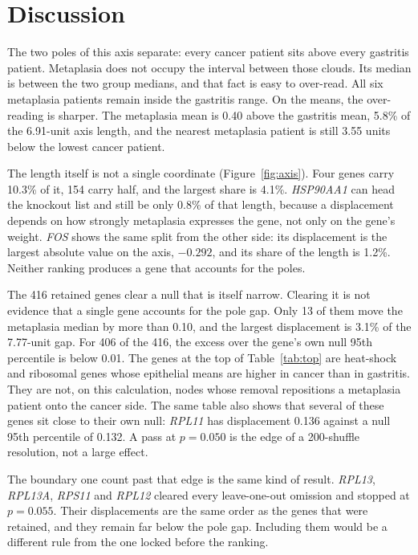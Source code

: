 \documentclass[11pt,a4paper]{article}
\begin{document}
\section{Discussion}

The two poles of this axis separate: every cancer patient sits above every gastritis patient. Metaplasia does not occupy the interval between those clouds. Its median is between the two group medians, and that fact is easy to over-read. All six metaplasia patients remain inside the gastritis range. On the means, the over-reading is sharper. The metaplasia mean is 0.40 above the gastritis mean, 5.8\% of the 6.91-unit axis length, and the nearest metaplasia patient is still 3.55 units below the lowest cancer patient.

The length itself is not a single coordinate (Figure~\ref{fig:axis}). Four genes carry 10.3\% of it, 154 carry half, and the largest share is 4.1\%. \textit{HSP90AA1} can head the knockout list and still be only 0.8\% of that length, because a displacement depends on how strongly metaplasia expresses the gene, not only on the gene's weight. \textit{FOS} shows the same split from the other side: its displacement is the largest absolute value on the axis, $-0.292$, and its share of the length is 1.2\%. Neither ranking produces a gene that accounts for the poles.

The 416 retained genes clear a null that is itself narrow. Clearing it is not evidence that a single gene accounts for the pole gap. Only 13 of them move the metaplasia median by more than 0.10, and the largest displacement is 3.1\% of the 7.77-unit gap. For 406 of the 416, the excess over the gene's own null 95th percentile is below 0.01. The genes at the top of Table~\ref{tab:top} are heat-shock and ribosomal genes whose epithelial means are higher in cancer than in gastritis. They are not, on this calculation, nodes whose removal repositions a metaplasia patient onto the cancer side. The same table also shows that several of these genes sit close to their own null: \textit{RPL11} has displacement 0.136 against a null 95th percentile of 0.132. A pass at \(p=0.050\) is the edge of a 200-shuffle resolution, not a large effect.

The boundary one count past that edge is the same kind of result. \textit{RPL13}, \textit{RPL13A}, \textit{RPS11} and \textit{RPL12} cleared every leave-one-out omission and stopped at \(p=0.055\). Their displacements are the same order as the genes that were retained, and they remain far below the pole gap. Including them would be a different rule from the one locked before the ranking.
\end{document}
